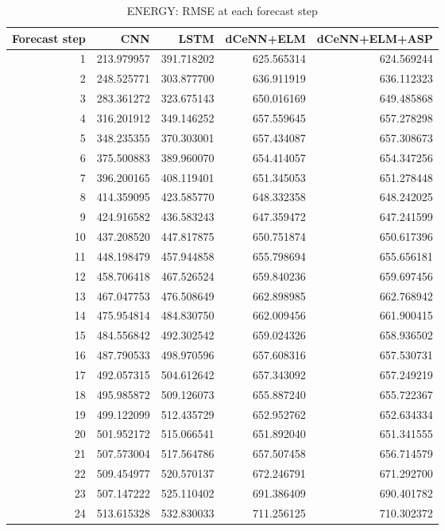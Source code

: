 \begin{table}
\caption{ENERGY: RMSE at each forecast step}
\begin{tabular}{rrrrr}
\toprule
Forecast step & CNN & LSTM & dCeNN+ELM & dCeNN+ELM+ASP \\
\midrule
1 & 213.979957 & 391.718202 & 625.565314 & 624.569244 \\
2 & 248.525771 & 303.877700 & 636.911919 & 636.112323 \\
3 & 283.361272 & 323.675143 & 650.016169 & 649.485868 \\
4 & 316.201912 & 349.146252 & 657.559645 & 657.278298 \\
5 & 348.235355 & 370.303001 & 657.434087 & 657.308673 \\
6 & 375.500883 & 389.960070 & 654.414057 & 654.347256 \\
7 & 396.200165 & 408.119401 & 651.345053 & 651.278448 \\
8 & 414.359095 & 423.585770 & 648.332358 & 648.242025 \\
9 & 424.916582 & 436.583243 & 647.359472 & 647.241599 \\
10 & 437.208520 & 447.817875 & 650.751874 & 650.617396 \\
11 & 448.198479 & 457.944858 & 655.798694 & 655.656181 \\
12 & 458.706418 & 467.526524 & 659.840236 & 659.697456 \\
13 & 467.047753 & 476.508649 & 662.898985 & 662.768942 \\
14 & 475.954814 & 484.830750 & 662.009456 & 661.900415 \\
15 & 484.556842 & 492.302542 & 659.024326 & 658.936502 \\
16 & 487.790533 & 498.970596 & 657.608316 & 657.530731 \\
17 & 492.057315 & 504.612642 & 657.343092 & 657.249219 \\
18 & 495.985872 & 509.126073 & 655.887240 & 655.722367 \\
19 & 499.122099 & 512.435729 & 652.952762 & 652.634334 \\
20 & 501.952172 & 515.066541 & 651.892040 & 651.341555 \\
21 & 507.573004 & 517.564786 & 657.507458 & 656.714579 \\
22 & 509.454977 & 520.570137 & 672.246791 & 671.292700 \\
23 & 507.147222 & 525.110402 & 691.386409 & 690.401782 \\
24 & 513.615328 & 532.830033 & 711.256125 & 710.302372 \\
\bottomrule
\end{tabular}
\end{table}
